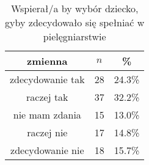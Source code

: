 \begin{table}[H]
\caption{Wspierał/a by wybór dziecko, gyby zdecydowało się spełniać w pielęgniarstwie}
\centering
\begin{tabular}{ | c | c | c |}
\hline
zmienna & $n$ & \% \\
\hline
zdecydowanie tak  &  28  & 24.3\% \\
\hline
raczej tak  &  37  & 32.2\% \\
\hline
nie mam zdania  &  15  & 13.0\% \\
\hline
raczej nie  &  17  & 14.8\% \\
\hline
zdecydowanie nie  &  18  & 15.7\% \\
\hline
\end{tabular}
\label{tab:Q37}
\end{table}
